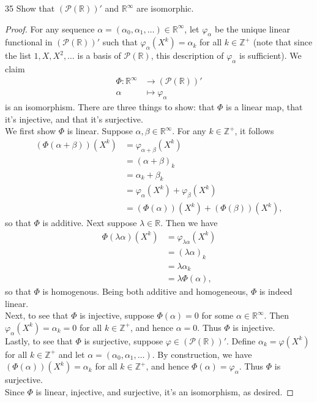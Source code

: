 \documentclass[11pt]{extarticle}
\newenvironment{problem}[1]{\begin{prob*}{#1}{}}{\end{prob*}}
\newcommand{\Z}{\mathbb{Z}}
\newcommand{\R}{\mathbb{R}}
\newcommand{\poly}{\mathcal{P}}
\begin{document}
\begin{problem}{35}
Show that $(\poly(\R))'$ and $\R^\infty$ are isomorphic.
\end{problem}
\begin{proof}
For any sequence $\alpha = (\alpha_0,\alpha_1,\dots)\in\R^\infty$, let $\varphi_\alpha$ be the unique linear functional in $(\poly(\R))'$ such that $\varphi_\alpha(X^k) = \alpha_k$ for all $k\in\Z^+$ (note that since the list $1,X,X^2,\dots$ is a basis of $\poly(\R)$, this description of $\varphi_\alpha$ is sufficient).  We claim
\begin{align*}
\Phi: \R^\infty &\to (\poly(\R))'\\
\alpha &\mapsto \varphi_\alpha
\end{align*}
is an isomorphism.  There are three things to show: that $\Phi$ is a linear map, that it's injective, and that it's surjective.\\
\indent We first show $\Phi$ is linear.  Suppose $\alpha,\beta\in \R^\infty$.  For any $k\in\Z^+$, it follows
\begin{align*}
(\Phi(\alpha + \beta))(X^k) &= \varphi_{\alpha+\beta}(X^k)\\
&= (\alpha + \beta)_k\\
&= \alpha_k + \beta_k\\
&= \varphi_\alpha(X^k) + \varphi_\beta(X^k)\\
&= (\Phi(\alpha))(X^k) + (\Phi(\beta))(X^k),
\end{align*}
so that $\Phi$ is additive.  Next suppose $\lambda\in\R$.  Then we have
\begin{align*}
\Phi(\lambda\alpha)(X^k) &= \varphi_{\lambda\alpha}(X^k)\\
&= (\lambda\alpha)_k\\
&= \lambda\alpha_k\\
&= \lambda\Phi(\alpha),
\end{align*}
so that $\Phi$ is homogenous.  Being both additive and homogeneous, $\Phi$ is indeed linear.\\
\indent Next, to see that $\Phi$ is injective, suppose $\Phi(\alpha)= 0$ for some $\alpha\in\R^\infty$.  Then $\varphi_\alpha(X^k) = \alpha_k = 0$ for all $k\in\Z^+$, and hence $\alpha = 0$.  Thus $\Phi$ is injective.\\
\indent Lastly, to see that $\Phi$ is surjective, suppose $\varphi\in (\poly(\R))'$.  Define $\alpha_k=\varphi(X^k)$ for all $k\in\Z^+$ and let $\alpha=(\alpha_0,\alpha_1,\dots)$.  By construction, we have $(\Phi(\alpha))(X^k) = \alpha_k$ for all $k\in\Z^+$, and hence $\Phi(\alpha) = \varphi_\alpha$.  Thus $\Phi$ is surjective.\\
\indent Since $\Phi$ is linear, injective, and surjective, it's an isomorphism, as desired.
\end{proof}
\end{document}
